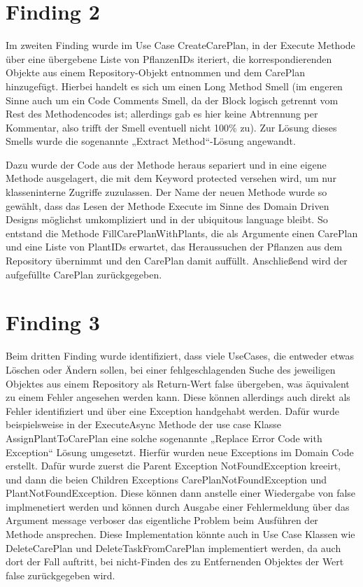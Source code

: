 \section{Finding 2}
Im zweiten Finding wurde im Use Case CreateCarePlan, in der Execute Methode über eine übergebene Liste von PflanzenIDs iteriert, die korrespondierenden Objekte aus einem Repository-Objekt entnommen und dem CarePlan hinzugefügt. Hierbei handelt es sich um einen Long Method Smell (im engeren Sinne auch um ein Code Comments Smell, da der Block logisch getrennt vom Rest des Methodencodes ist; allerdings gab es hier keine Abtrennung per Kommentar, also trifft der Smell eventuell nicht 100\% zu). Zur Lösung dieses Smells wurde die sogenannte „Extract Method“-Lösung angewandt. 
\par
Dazu wurde der Code aus der Methode heraus separiert und in eine eigene Methode ausgelagert, die mit dem Keyword protected versehen wird, um nur klasseninterne Zugriffe zuzulassen. Der Name der neuen Methode wurde so gewählt, dass das Lesen der Methode Execute im Sinne des Domain Driven Designs möglichst umkompliziert und in der ubiquitous language bleibt. So entstand die Methode FillCarePlanWithPlants, die als Argumente einen CarePlan und eine Liste von PlantIDs erwartet, das Heraussuchen der Pflanzen aus dem Repository übernimmt und den CarePlan damit auffüllt. Anschließend wird der aufgefüllte CarePlan zurückgegeben. 
\section{Finding 3}
Beim dritten Finding wurde identifiziert, dass viele UseCases, die entweder etwas Löschen oder Ändern sollen, bei einer fehlgeschlagenden Suche des jeweiligen Objektes aus einem Repository als Return-Wert false übergeben, was äquivalent zu einem Fehler angesehen werden kann.  Diese können allerdings auch direkt als Fehler identifiziert und über eine Exception handgehabt werden. Dafür wurde beispielsweise in der ExecuteAsync Methode der use case Klasse AssignPlantToCarePlan eine solche sogenannte „Replace Error Code with Exception“ Lösung umgesetzt. Hierfür wurden neue Exceptions im Domain Code erstellt. Dafür wurde zuerst die Parent Exception NotFoundException kreeirt, und dann die beien Children Exceptions CarePlanNotFoundException und PlantNotFoundException. Diese können dann anstelle einer Wiedergabe von false implmenetiert werden und können durch Ausgabe einer Fehlermeldung über das Argument message verboser das eigentliche Problem beim Ausführen der Methode ansprechen. Diese Implementation könnte auch in Use Case Klassen wie DeleteCarePlan und DeleteTaskFromCarePlan implementiert werden, da auch dort der Fall auftritt, bei nicht-Finden des zu Entfernenden Objektes der Wert false zurückgegeben wird.

